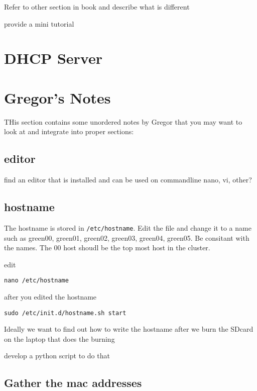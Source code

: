 Refer to other section in book and describe what is different

\begin{exercise}
provide a mini tutorial 
\end{exercise}

\section{DHCP Server}


\section{Gregor's Notes}

THis section contains some unordered notes by Gregor that you may want
to look at and integrate into proper sections:

\subsection{editor}

find an editor that is installed and can be used on commandline nano, vi, other?
\subsection{hostname}

The hostname is stored in \verb|/etc/hostname|. Edit the file and
change it to a name such as green00, green01, green02, green03, green04,
green05. Be consitant with the names. The 00 host shoudl be the top
most host in the cluster.

edit

\begin{lstlisting}
nano /etc/hostname
\end{lstlisting}

after you edited the hostname

\begin{lstlisting}
sudo /etc/init.d/hostname.sh start
\end{lstlisting}

Ideally we want to find out how to write the hostname after we burn
the SDcard on the laptop that does the burning

develop a python script to do that

\subsection{Gather the mac addresses}

